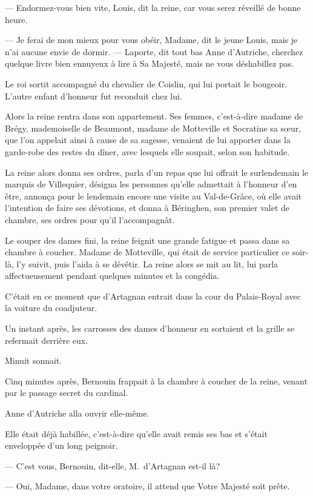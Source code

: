 — Endormez-vous bien vite, Louis, dit la reine, car vous serez réveillé de bonne heure.

— Je ferai de mon mieux pour vous obéir, Madame, dit le jeune Louis, mais je n'ai aucune envie de dormir.
— Laporte, dit tout bas Anne d'Autriche, cherchez quelque livre bien ennuyeux à lire à Sa Majesté, mais ne vous déshabillez pas.

Le roi sortit accompagné du chevalier de Coislin, qui lui portait le bougeoir. L'autre enfant d'honneur fut reconduit chez lui.

Alors la reine rentra dans son appartement. Ses femmes, c'est-à-dire madame de Brégy, mademoiselle de Beaumont, madame de Motteville et Socratine sa sœur, que l'on appelait ainsi à cause de sa sagesse, venaient de lui apporter dans la garde-robe des restes du dîner, avec lesquels elle soupait, selon son habitude.

La reine alors donna ses ordres, parla d'un repas que lui offrait le surlendemain le marquis de Villequier, désigna les personnes qu'elle admettait à l'honneur d'en être, annonça pour le lendemain encore une visite au Val-de-Grâce, où elle avait l'intention de faire ses dévotions, et donna à Béringhen, son premier valet de chambre, ses ordres pour qu'il l'accompagnât.

Le souper des dames fini, la reine feignit une grande fatigue et passa dans sa chambre à coucher. Madame de Motteville, qui était de service particulier ce soir-là, l'y suivit, puis l'aida à se dévêtir. La reine alors se mit au lit, lui parla affectueusement pendant quelques minutes et la congédia.

C'était en ce moment que d'Artagnan entrait dans la cour du Palais-Royal avec la voiture du coadjuteur.

Un instant après, les carrosses des dames d'honneur en sortaient et la grille se refermait derrière eux.

Minuit sonnait.

Cinq minutes après, Bernouin frappait à la chambre à coucher de la reine, venant par le passage secret du cardinal.

Anne d'Autriche alla ouvrir elle-même.

Elle était déjà habillée, c'est-à-dire qu'elle avait remis ses bas et s'était enveloppée d'un long peignoir.

— C'est vous, Bernouin, dit-elle, M.~d'Artagnan est-il là?

— Oui, Madame, dans votre oratoire, il attend que Votre Majesté soit prête.


